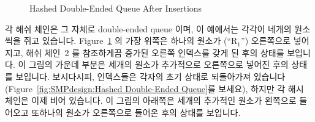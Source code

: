 \begin{figure}[tb]
\centering
{}
\caption{Hashed Double-Ended Queue After Insertions}
\label{fig:SMPdesign:Hashed Double-Ended Queue After Insertions}
\end{figure}

각 해쉬 체인은 그 자체로 double-ended queue 이며, 이 예에서는 각각이 네개의
원소씩을 쥐고 있습니다.
Figure~\ref{fig:SMPdesign:Hashed Double-Ended Queue After Insertions}
의 가장 위쪽은 하나의 원소가 (``R$_1$'') 오른쪽으로 넣어지고, 해쉬 체인~2 를
참조하게끔 증가된 오른쪽 인덱스를 갖게 된 후의 상태를 보입니다.
이 그림의 가운데 부분은 세개의 원소가 추가적으로 오른쪽으로 넣어진 후의 상태를
보입니다.
보시다시피, 인덱스들은 각자의 초기 상태로 되돌아가져 있습니다
(Figure~\ref{fig:SMPdesign:Hashed Double-Ended Queue}를 보세요), 하지만 각 해시
체인은 이제 비어 있습니다.
이 그림의 아래쪽은 세개의 추가적인 원소가 왼쪽으로 들어오고 또하나의 원소가
오른쪽으로 들어온 후의 상태를 보입니다.

